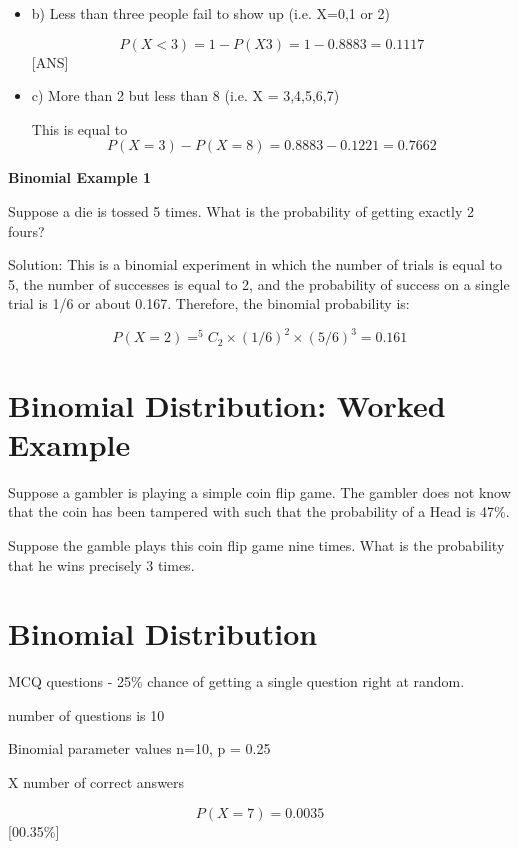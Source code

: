 {\begin{itemize}
\[P(X=6) =0.3839\]

\item b) Less than three people fail to show up (i.e. X=0,1 or 2)

\[P(X < 3) = 1- P(X3) =    1 - 0.8883  = 0.1117\] [ANS]


\item c) More than 2 but less than 8   (i.e. X = 3,4,5,6,7)

This is equal to \[P(X=3) - P(X=8) = 0.8883 -0.1221 =  0.7662\]

\end{itemize}


\noindent \textbf{ Binomial Example 1}

Suppose a die is tossed 5 times. What is the probability of getting exactly 2 fours?

Solution: This is a binomial experiment in which the number of trials is equal to 5, the number of successes is equal to 2, and the probability of success on a single trial is 1/6 or about 0.167. Therefore, the binomial probability is:

\[P(X=2) = ^5C_2 \times (1/6)^2 \times (5/6)^3 = 0.161\]



\section{Binomial Distribution: Worked Example}
Suppose a gambler is playing a simple coin flip game. 
The gambler does not know that the coin has been tampered with such that the probability of a Head is 47\%.

Suppose the gamble plays this coin flip game nine times. 
What is the probability that he wins precisely 3 times.





\section{Binomial Distribution}

MCQ questions  - 25\% chance of getting a single question right at random.

number of questions is 10

Binomial parameter values n=10, p = 0.25

X number of correct answers


\[P(X=7) = 0.0035 \]       [00.35\%]



}

